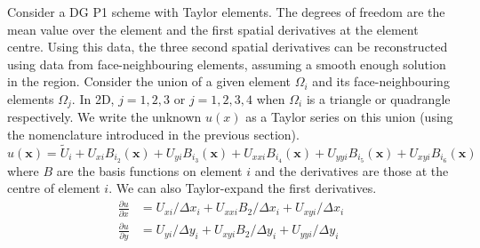 \documentclass[11pt]{article}
\let\bld\boldsymbol
\begin{document}
Consider a DG P1 scheme with Taylor elements. The degrees of freedom are the mean value over the element and the first spatial derivatives at the element centre. Using this data, the three second spatial derivatives can be reconstructed using data from face-neighbouring elements, assuming a smooth enough solution in the region. Consider the union of a given element $\Omega_i$ and its face-neighbouring elements $\Omega_j$. In 2D, $j = 1,2,3$ or $j = 1,2,3,4$ when $\Omega_i$ is a triangle or quadrangle respectively. We write the unknown $u(x)$ as a Taylor series on this union (using the nomenclature introduced in the previous section).
\begin{equation}
u(\bld{x}) = \tilde{U}_i + U_{xi}B_{i_2}(\bld{x}) + U_{yi}B_{i_3}(\bld{x}) + U_{xxi} B_{i_4}(\bld{x}) + U_{yyi} B_{i_5}(\bld{x}) + U_{xyi} B_{i_6}(\bld{x})
\end{equation}
where $B$ are the basis functions on element $i$ and the derivatives are those at the centre of element $i$. We can also Taylor-expand the first derivatives.
\begin{align}
\frac{\partial u}{\partial x} &= U_{xi}/\Delta x_i + U_{xxi} B_2 / \Delta x_i + U_{xyi}/\Delta x_i \\
\frac{\partial u}{\partial y} &= U_{yi}/\Delta y_i + U_{xyi} B_2 / \Delta y_i + U_{yyi}/\Delta y_i
\end{align}
\end{document}

